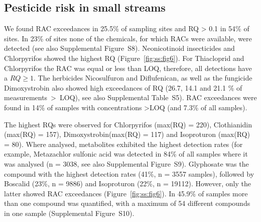 \clearpage
\subsection{Pesticide risk in small streams}
We found RAC exceedances in 25.5\% of sampling sites and RQ > 0.1 in 54\% of sites. 
In 23\% of sites none of the chemicals, for which RACs were available, were detected (see also Supplemental Figure~S8).
Neonicotinoid insecticides and Chlorpyrifos showed the highest RQ (Figure~\ref{fig:ss:fig6}). %
For Thiacloprid and Chlorpyrifos the RAC was equal or less than LOQ, therefore, all detections have a $RQ \ge 1$. 
The herbicides Nicosulfuron and Diflufenican, as well as the fungicide Dimoxystrobin also showed high exceedances of RQ (26.7, 14.1 and 21.1 \% of measurements~\textgreater~LOQ), see also Supplemental Table~S5).
RAC exceedances were found in 14\% of samples with concentrations \textgreater LOQ (and 7.3\% of all samples).

The highest RQs were observed for Chlorpyrifos (max(RQ) = 220), Clothianidin (max(RQ) = 157), Dimoxystrobin(max(RQ) = 117) and Isoproturon (max(RQ) = 80). 
Where analysed, metabolites exhibited the highest detection rates (for example, Metazachlor sulfonic acid was detected in 84\% of all samples where it was analysed (n = 3038, see also Supplemental Figure~S9).
Glyphosate was the compound with the highest detection rates (41\%, n = 3557 samples), followed by Boscalid (23\%, n = 9886) and Isoproturon (22\%, n = 19112). 
However, only the latter showed RAC exceedances (Figure~\ref{fig:ss:fig6}).
In 45.9\% of samples more than one compound was quantified, with a maximum of 54 different compounds in one sample (Supplemental Figure~S10). 

